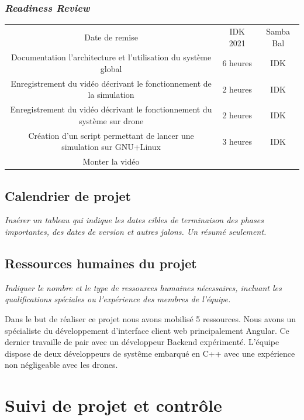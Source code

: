 \documentclass{mistcoursedoc}
\begin{document}
\subsubsection{\emph{Readiness Review}}

\begin{center}
  \begin{tabular}{ c c c }
    Date de remise & IDK 2021 & Samba Bal \\
    
    Documentation l’architecture et l’utilisation du système global & 6 heures & IDK \\
    Enregistrement du vidéo décrivant le fonctionnement de la simulation & 2 heures & IDK \\
    Enregistrement du vidéo décrivant le fonctionnement du système sur drone & 2 heures & IDK \\
    Création d’un script permettant de lancer une simulation sur GNU+Linux & 3 heures & IDK \\
    Monter la vidéo 
  \end{tabular}
\end{center}

\subsection{Calendrier de projet}

\textit{Insérer un tableau qui indique les dates cibles de terminaison des phases importantes, des dates de version et autres jalons.  Un résumé seulement.}

\subsection{Ressources humaines du projet}

\textit{Indiquer le nombre et le type de ressources humaines nécessaires, incluant les qualifications spéciales ou l’expérience des membres de l’équipe.}

\par Dans le but de réaliser ce projet nous avons mobilisé 5 ressources. 
 Nous avons un spécialiste du développement d'interface client web principalement Angular. Ce dernier travaille de pair avec un développeur Backend expérimenté. 
 L'équipe dispose de deux développeurs de systême embarqué en C++ avec une expérience non négligeable avec les drones. 

\section{Suivi de projet et contrôle}
\end{document}
